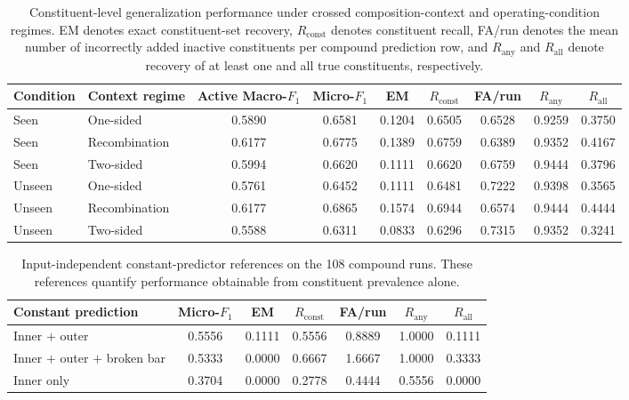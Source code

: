 \begin{table}[!t]
\caption{Constituent-level generalization performance under crossed
composition-context and operating-condition regimes. EM denotes exact
constituent-set recovery, $R_{\mathrm{const}}$ denotes constituent recall,
FA/run denotes the mean number of incorrectly added inactive constituents
per compound prediction row, and $R_{\mathrm{any}}$ and $R_{\mathrm{all}}$
denote recovery of at least one and all true constituents, respectively.}
\label{tab:crossed}
\centering
\begin{tabular}{l l c c c c c c c}
\toprule
Condition & Context regime & Active Macro-$F_1$ & Micro-$F_1$ & EM &
$R_{\mathrm{const}}$ & FA/run & $R_{\mathrm{any}}$ & $R_{\mathrm{all}}$ \\
\midrule
Seen   & One-sided     & 0.5890 & 0.6581 & 0.1204 & 0.6505 & 0.6528 & 0.9259 & 0.3750 \\
Seen   & Recombination & 0.6177 & 0.6775 & 0.1389 & 0.6759 & 0.6389 & 0.9352 & 0.4167 \\
Seen   & Two-sided     & 0.5994 & 0.6620 & 0.1111 & 0.6620 & 0.6759 & 0.9444 & 0.3796 \\
Unseen & One-sided     & 0.5761 & 0.6452 & 0.1111 & 0.6481 & 0.7222 & 0.9398 & 0.3565 \\
Unseen & Recombination & 0.6177 & 0.6865 & 0.1574 & 0.6944 & 0.6574 & 0.9444 & 0.4444 \\
Unseen & Two-sided     & 0.5588 & 0.6311 & 0.0833 & 0.6296 & 0.7315 & 0.9352 & 0.3241 \\
\bottomrule
\end{tabular}
\end{table}

\begin{table}[!t]
\caption{Input-independent constant-predictor references on the 108
compound runs. These references quantify performance obtainable from
constituent prevalence alone.}
\label{tab:trivial}
\centering
\begin{tabular}{l c c c c c c}
\toprule
Constant prediction & Micro-$F_1$ & EM & $R_{\mathrm{const}}$ & FA/run &
$R_{\mathrm{any}}$ & $R_{\mathrm{all}}$ \\
\midrule
Inner $+$ outer                & 0.5556 & 0.1111 & 0.5556 & 0.8889 & 1.0000 & 0.1111 \\
Inner $+$ outer $+$ broken bar & 0.5333 & 0.0000 & 0.6667 & 1.6667 & 1.0000 & 0.3333 \\
Inner only                     & 0.3704 & 0.0000 & 0.2778 & 0.4444 & 0.5556 & 0.0000 \\
\bottomrule
\end{tabular}
\end{table}

